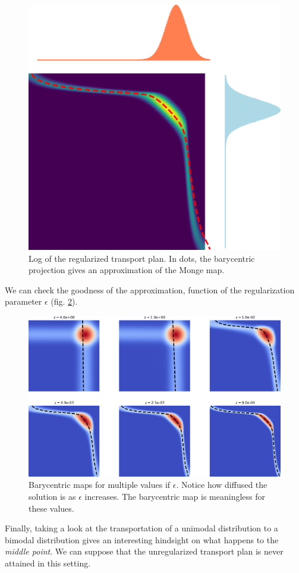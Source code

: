 \begin{figure}[p]
    \centering
    \includegraphics[width=.6\textwidth]{samples/2/coupling_histograms.png}
    \caption{Log of the regularized transport plan. In dots, the barycentric projection gives an approximation of the Monge map.}
    \label{fig:coupling_histograms}
\end{figure}

We can check the goodness of the approximation, function of the regularization parameter $\epsilon$ (fig. \ref{fig:barycentric_maps}).

\begin{figure}[p]
    \centering
    \includegraphics[width=\textwidth]{samples/2/barycentric_maps.png}
    \caption{Barycentric maps for multiple values if $\epsilon$. Notice how diffused the solution is as $\epsilon$ increases. The barycentric map is meaningless for these values.}
    \label{fig:barycentric_maps}
\end{figure}

Finally, taking a look at the transportation of a unimodal distribution to a bimodal distribution gives an interesting hindsight on what happens to the \textit{middle point}. We can suppose that the unregularized transport plan is never attained in this setting. 

